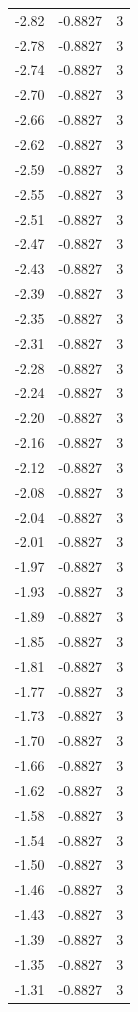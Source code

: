 \begin{longtable}{lrr}
  -2.82 & -0.8827 & 3 \\
  -2.78 & -0.8827 & 3 \\
  -2.74 & -0.8827 & 3 \\
  -2.70 & -0.8827 & 3 \\
  -2.66 & -0.8827 & 3 \\
  -2.62 & -0.8827 & 3 \\
  -2.59 & -0.8827 & 3 \\
  -2.55 & -0.8827 & 3 \\
  -2.51 & -0.8827 & 3 \\
  -2.47 & -0.8827 & 3 \\
  -2.43 & -0.8827 & 3 \\
  -2.39 & -0.8827 & 3 \\
  -2.35 & -0.8827 & 3 \\
  -2.31 & -0.8827 & 3 \\
  -2.28 & -0.8827 & 3 \\
  -2.24 & -0.8827 & 3 \\
  -2.20 & -0.8827 & 3 \\
  -2.16 & -0.8827 & 3 \\
  -2.12 & -0.8827 & 3 \\
  -2.08 & -0.8827 & 3 \\
  -2.04 & -0.8827 & 3 \\
  -2.01 & -0.8827 & 3 \\
  -1.97 & -0.8827 & 3 \\
  -1.93 & -0.8827 & 3 \\
  -1.89 & -0.8827 & 3 \\
  -1.85 & -0.8827 & 3 \\
  -1.81 & -0.8827 & 3 \\
  -1.77 & -0.8827 & 3 \\
  -1.73 & -0.8827 & 3 \\
  -1.70 & -0.8827 & 3 \\
  -1.66 & -0.8827 & 3 \\
  -1.62 & -0.8827 & 3 \\
  -1.58 & -0.8827 & 3 \\
  -1.54 & -0.8827 & 3 \\
  -1.50 & -0.8827 & 3 \\
  -1.46 & -0.8827 & 3 \\
  -1.43 & -0.8827 & 3 \\
  -1.39 & -0.8827 & 3 \\
  -1.35 & -0.8827 & 3 \\
  -1.31 & -0.8827 & 3 \\

\end{longtable}

